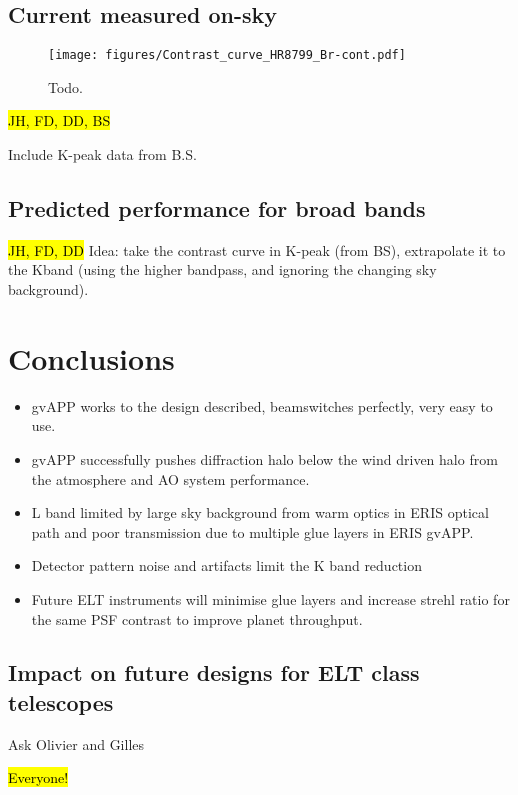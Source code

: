 \documentclass{aa}
\begin{document}
\subsection{Current measured on-sky}
\begin{figure}
    \centering
    \texttt{[image: figures/Contrast\_curve\_HR8799\_Br-cont.pdf]}
    \caption{Todo.}
    \label{fig:lprime_cc}
\end{figure}

\hl{JH, FD, DD, BS}

Include K-peak data from B.S.

\subsection{Predicted performance for broad bands}
\hl{JH, FD, DD}
Idea: take the contrast curve in K-peak (from BS), extrapolate it to the Kband (using the higher bandpass, and ignoring the changing sky background).

\section{Conclusions}\label{sec:conclusion}


\begin{itemize}
    \item gvAPP works to the design described, beamswitches perfectly, very easy to use.
    \item gvAPP successfully pushes diffraction halo below the wind driven halo from the atmosphere and AO system performance.
    \item L band limited by large sky background from warm optics in ERIS optical path and poor transmission due to multiple glue layers in ERIS gvAPP.
    \item Detector pattern noise and artifacts limit the K band reduction
    \item Future ELT instruments will minimise glue layers and increase strehl ratio for the same PSF contrast to improve planet throughput.
\end{itemize}

\subsection{Impact on future designs for ELT class telescopes}

Ask Olivier and Gilles

\hl{Everyone!}
\end{document}
